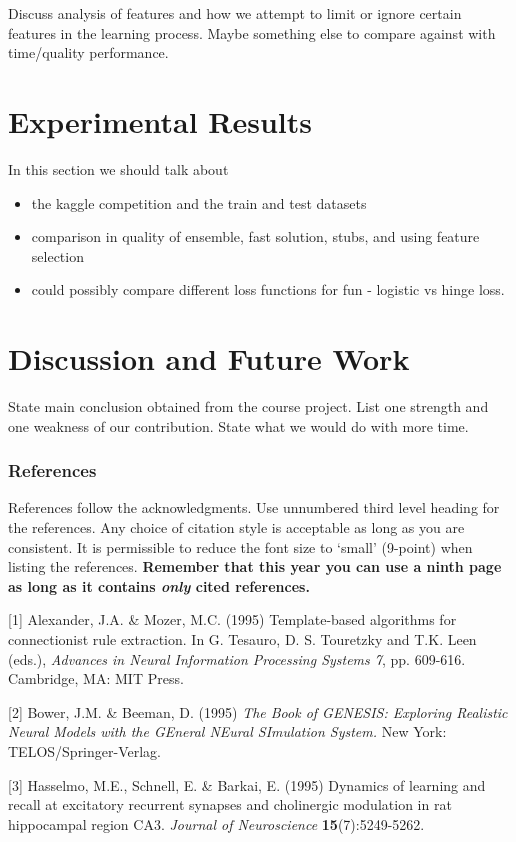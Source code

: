 \documentclass{article} %
\begin{document}
Discuss analysis of features and how we attempt to limit or ignore certain features in the learning process. Maybe something else to compare against with time/quality performance.

\section{Experimental Results}

In this section we should talk about

\begin{itemize}
\item the kaggle competition and the train and test datasets
\item comparison in quality of ensemble, fast solution, stubs, and using feature selection
\item could possibly compare different loss functions for fun - logistic vs hinge loss.
\end{itemize}

\section{Discussion and Future Work}

State main conclusion obtained from the course project. List one strength and one weakness of our contribution. State what we would do with more time.

\subsubsection*{References}

References follow the acknowledgments. Use unnumbered third level heading for
the references. Any choice of citation style is acceptable as long as you are
consistent. It is permissible to reduce the font size to `small' (9-point) 
when listing the references. {\bf Remember that this year you can use
a ninth page as long as it contains \emph{only} cited references.}

\small{
[1] Alexander, J.A. \& Mozer, M.C. (1995) Template-based algorithms
for connectionist rule extraction. In G. Tesauro, D. S. Touretzky
and T.K. Leen (eds.), {\it Advances in Neural Information Processing
Systems 7}, pp. 609-616. Cambridge, MA: MIT Press.

[2] Bower, J.M. \& Beeman, D. (1995) {\it The Book of GENESIS: Exploring
Realistic Neural Models with the GEneral NEural SImulation System.}
New York: TELOS/Springer-Verlag.

[3] Hasselmo, M.E., Schnell, E. \& Barkai, E. (1995) Dynamics of learning
and recall at excitatory recurrent synapses and cholinergic modulation
in rat hippocampal region CA3. {\it Journal of Neuroscience}
{\bf 15}(7):5249-5262.
}
\end{document}
